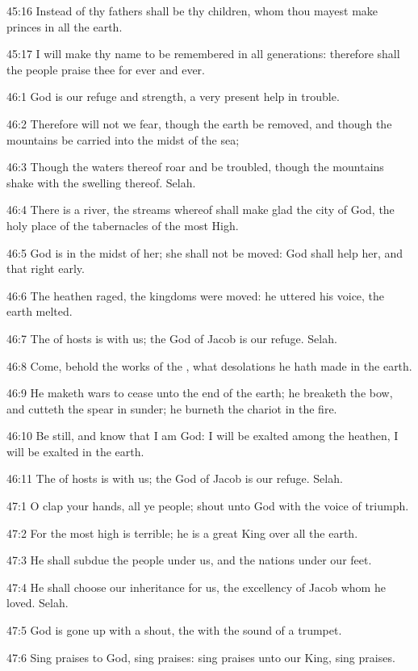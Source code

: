 45:16 Instead of thy fathers shall be thy children, whom thou mayest
make princes in all the earth.

45:17 I will make thy name to be remembered in all generations:
therefore shall the people praise thee for ever and ever.



46:1 God is our refuge and strength, a very present help in trouble.

46:2 Therefore will not we fear, though the earth be removed, and
though the mountains be carried into the midst of the sea;

46:3 Though the waters thereof roar and be troubled, though the
mountains shake with the swelling thereof. Selah.

46:4 There is a river, the streams whereof shall make glad the city of
God, the holy place of the tabernacles of the most High.

46:5 God is in the midst of her; she shall not be moved: God shall
help her, and that right early.

46:6 The heathen raged, the kingdoms were moved: he uttered his voice,
the earth melted.

46:7 The \LORD of hosts is with us; the God of Jacob is our refuge.
Selah.

46:8 Come, behold the works of the \LORD, what desolations he hath made
in the earth.

46:9 He maketh wars to cease unto the end of the earth; he breaketh
the bow, and cutteth the spear in sunder; he burneth the chariot in
the fire.

46:10 Be still, and know that I am God: I will be exalted among the
heathen, I will be exalted in the earth.

46:11 The \LORD of hosts is with us; the God of Jacob is our refuge.
Selah.



47:1 O clap your hands, all ye people; shout unto God with the voice
of triumph.

47:2 For the \LORD most high is terrible; he is a great King over all
the earth.

47:3 He shall subdue the people under us, and the nations under our
feet.

47:4 He shall choose our inheritance for us, the excellency of Jacob
whom he loved. Selah.

47:5 God is gone up with a shout, the \LORD with the sound of a
trumpet.

47:6 Sing praises to God, sing praises: sing praises unto our King,
sing praises.

